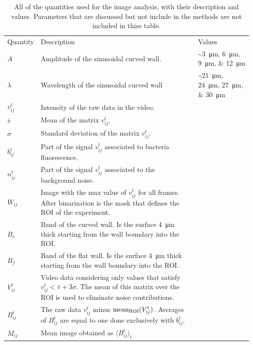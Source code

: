 \begin{table}[!h]
   \centering
    \small
    \caption[Summary of all quantities used in the image analysis]{All of the quantities used for the image analysis, with their description and values. Parameters that are discussed but not include in the methods are not included in thise table. }
    \begin{tabularx}{\textwidth}{lXl}
    \hline\noalign{\smallskip}
         Quantity  & Description & Values   \\
    \noalign{\smallskip}\hline\noalign{\smallskip}
         $A$ & Amplitude of the sinusoidal curved wall. & \sim \SIlist[list-units=single, list-final-separator = {, }]{3;6;9;12}{\micro\meter} \\ 
         $\lambda$ & Wavelength of the sinusoidal curved wall & \sim \SIlist[list-units=single, list-final-separator = {, }]{21;24;27;30}{\micro\meter} \\
         $v_{ij}^t$ & Intensity of the raw data in the video. & \quad \\
         $\bar{v}$ & Mean of the matrix $v_{ij}^t$. & \quad \\
         $\sigma$ & Standard deviation of the matrix $v_{ij}^t$. & \quad \\
         $b_{ij}^t$ & Part of the signal $v_{ij}^t$ associated to bacteria fluorescence. & \quad \\
         $n_{ij}^t$ & Part of the signal $v_{ij}^t$ associated to the background noise. & \quad \\
         $W_{ij}$ & Image with the max value of $v_{ij}^t$ for all frames. After binarization is the mask that defines the ROI of the experiment. & \quad \\
         $B_c$ & Band of the curved wall. Is the surface \SI{4}{\micro\meter} thick starting from the wall boundary into the ROI.  & \quad \\
         $B_f$ & Band of the flat wall. Is the surface \SI{4}{\micro\meter} thick starting from the wall boundary into the ROI.  & \quad \\
         $V_{ij}^t$ & Video data considering only values that satisfy $v_{ij}^t  < \bar{v} + 3 \sigma$. The mean of this matrix over the ROI is used to eliminate noise contributions.  & \quad \\
         $B_{ij}^t$ & The raw data $v_{ij}^t$ minus ${\rm mean_{ROI}}(V_{ij}^t)$. Averages of $B_{ij}^t$ are equal to one done exclusively with $b_{ij}^t$.  & \quad \\
         $M_{ij}$ & Mean image obtained as $\langle B_{ij}^t \rangle_t$  & \quad \\

\end{tabularx}
\end{table}
